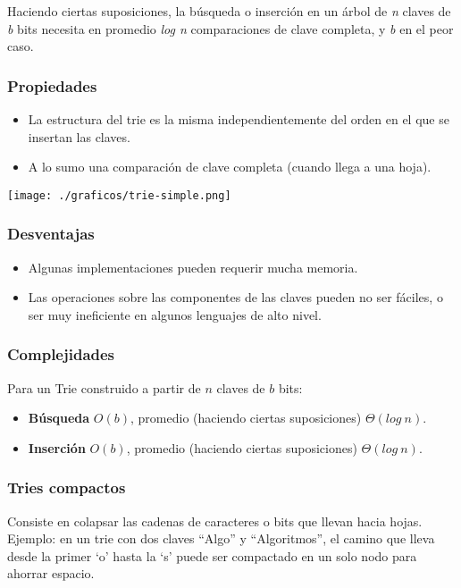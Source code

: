 Haciendo ciertas suposiciones, la b\'usqueda o inserci\'on en un \'arbol de \textit{n} claves de \textit{b} bits necesita en promedio \textit{log n} comparaciones de clave completa, y \textit{b} en el peor caso.

\subsubsection{Propiedades}
\begin{itemize}
 \item La estructura del trie es la misma independientemente del orden en el que se insertan las claves.
 \item A lo sumo una comparaci\'on de clave completa (cuando llega a una hoja).
\end{itemize}

\begin{center}
 \texttt{[image: ./graficos/trie-simple.png]}
\end{center}

\subsubsection{Desventajas}
\begin{itemize}
 \item Algunas implementaciones pueden requerir mucha memoria.
 \item Las operaciones sobre las componentes de las claves pueden no ser f\'aciles, o ser muy ineficiente en algunos lenguajes de alto nivel.
\end{itemize}

\subsubsection{Complejidades}

Para un Trie construido a partir de $n$ claves de $b$ bits:

\begin{itemize}
 \item \textbf{B\'usqueda} $O(b)$, promedio (haciendo ciertas suposiciones) $\Theta(log\ n)$.
 \item \textbf{Inserci\'on} $O(b)$, promedio (haciendo ciertas suposiciones) $\Theta(log\ n)$.
\end{itemize}

\subsubsection{Tries compactos}
Consiste en colapsar las cadenas de caracteres o bits que llevan hacia hojas.
Ejemplo: en un trie con dos claves ``Algo'' y ``Algoritmos'', el camino que lleva desde la primer `o' hasta la `s' puede ser compactado en un solo nodo para ahorrar espacio.
